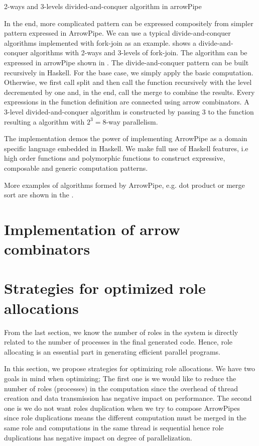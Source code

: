 \begin{listing}[ht]
    \inputminted{Haskell}{arrow/dq.hs}
    \caption{2-ways and 3-levels divided-and-conquer algorithm in arrowPipe}
    \label{arrowPipe:dq}
\end{listing}
In the end, more complicated pattern can be expressed compositely from simpler pattern expressed in ArrowPipe. We can use a typical divide-and-conquer algorithms implemented with fork-join as an example.  shows a divide-and-conquer algorithms with 2-ways and 3-levels of fork-join. The algorithm can be expressed in arrowPipe shown in . The divide-and-conquer pattern can be built recursively in Haskell. For the base case, we simply apply the basic computation. Otherwise, we first call split and then call the function recursively with the level decremented by one and, in the end, call the merge to combine the results. Every expressions in the function definition are connected using arrow combinators. A 3-level divided-and-conquer algorithm is constructed by passing 3 to the function resulting a algorithm with $2^3 = 8$-way parallelism.

The implementation demos the power of implementing ArrowPipe as a domain specific language embedded in Haskell. We make full use of Haskell features, i.e high order functions and polymorphic functions to construct expressive, composable and generic computation patterns.

More examples of algorithms formed by ArrowPipe, e.g. dot product or merge sort are shown in the .
\section{Implementation of arrow combinators} \label{arrowPipe:impl}
\section{Strategies for optimized role allocations} \label{arrowPipe:roleAllc}
From the last section, we know the number of roles in the system is directly related to the number of processes in the final generated code. Hence, role allocating is an essential part in generating efficient parallel programs. 

In this section, we propose strategies for optimizing role allocations. We have two goals in mind when optimizing; The first one is we would like to reduce the number of roles (processes) in the computation since the overhead of thread creation and data transmission has negative impact on performance. The second one is we do not want roles duplication when we try to compose ArrowPipes since role duplications means the different computation must be merged in the same role and computations in the same thread is sequential hence role duplications has negative impact on degree of parallelization. 

